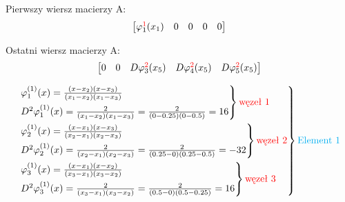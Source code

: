 \documentclass[9pt, a4paper]{article}
\begin{document}
Pierwszy wiersz macierzy A:
\[
\begin{bmatrix}
\varphi_1^{\textcolor{red}{1}}(x_1)&0&0&0&0
\end{bmatrix}
\]

Ostatni wiersz macierzy A:
\[
\begin{bmatrix}
0&0&D\varphi_3^{\textcolor{red}{2}}(x_5)&D\varphi_4^{\textcolor{red}{2}}(x_5)&D\varphi_5^{\textcolor{red}{2}}(x_5)
\end{bmatrix}
\]

\begin{align*}
\begin{rcases}
\begin{rcases}
\varphi_1^{(1)}(x)=\frac{(x-x_2)(x-x_3)}{(x_1-x_2)(x_1-x_3)}\\
D^2\varphi_1^{(1)}(x)=\frac{2}{(x_1-x_2)(x_1-x_3)}=\frac{2}{(0-0.25)(0-0.5)}=16
\end{rcases}
\text{\textcolor{red}{węzeł 1}}\\
\begin{rcases}
\varphi_2^{(1)}(x)=\frac{(x-x_1)(x-x_3)}{(x_2-x_1)(x_2-x_3)}\\
D^2\varphi_2^{(1)}(x)=\frac{2}{(x_2-x_1)(x_2-x_3)}=\frac{2}{(0.25-0)(0.25-0.5)}=-32
\end{rcases}
\text{\textcolor{red}{węzeł 2}}\\
\begin{rcases}
\varphi_3^{(1)}(x)=\frac{(x-x_1)(x-x_2)}{(x_3-x_1)(x_3-x_2)}\\
D^2\varphi_3^{(1)}(x)=\frac{2}{(x_3-x_1)(x_3-x_2)}=\frac{2}{(0.5-0)(0.5-0.25)}=16
\end{rcases}
\text{\textcolor{red}{węzeł 3}}\\
\end{rcases}
\text{\textcolor{cyan}{Element 1}}
\end{align*}
\end{document}
